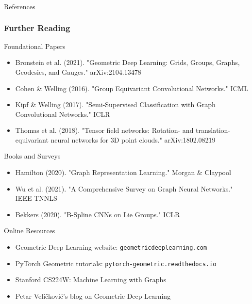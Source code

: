 \begin{frame}[fragile]\frametitle{}
\begin{center}
{\Large References}
\end{center}
\end{frame}


\begin{frame}[fragile]\frametitle{Further Reading}

\begin{block}{Foundational Papers}
\begin{itemize}
\item Bronstein et al. (2021). "Geometric Deep Learning: Grids, Groups, Graphs, Geodesics, and Gauges." arXiv:2104.13478
\item Cohen \& Welling (2016). "Group Equivariant Convolutional Networks." ICML
\item Kipf \& Welling (2017). "Semi-Supervised Classification with Graph Convolutional Networks." ICLR
\item Thomas et al. (2018). "Tensor field networks: Rotation- and translation-equivariant neural networks for 3D point clouds." arXiv:1802.08219
\end{itemize}
\end{block}

\begin{block}{Books and Surveys}
\begin{itemize}
\item Hamilton (2020). "Graph Representation Learning." Morgan \& Claypool
\item Wu et al. (2021). "A Comprehensive Survey on Graph Neural Networks." IEEE TNNLS
\item Bekkers (2020). "B-Spline CNNs on Lie Groups." ICLR
\end{itemize}
\end{block}

\begin{block}{Online Resources}
\begin{itemize}
\item Geometric Deep Learning website: \texttt{geometricdeeplearning.com}
\item PyTorch Geometric tutorials: \texttt{pytorch-geometric.readthedocs.io}
\item Stanford CS224W: Machine Learning with Graphs
\item Petar Veličković's blog on Geometric Deep Learning
\end{itemize}
\end{block}

\end{frame}